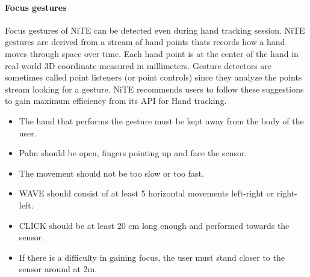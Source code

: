 

\paragraph*{Focus gestures} Focus gestures of NiTE can be detected even during hand tracking session. NiTE gestures are derived from a stream of hand points thats records how a hand moves through space over time. Each hand point is at the center of the hand in real-world 3D coordinate measured in millimeters. Gesture detectors are sometimes called point listeners (or point controls) since they analyze the points stream looking for a gesture. NiTE recommends users to follow these suggestions to gain maximum efficiency from its API for Hand tracking.
\begin{itemize}
	\item The hand that performs the gesture must be kept away from the body of the user. 
	\item Palm should be open, fingers pointing up and face the sensor. 
	\item The movement should not be too slow or too fast. 
	\item WAVE should consist of at least 5 horizontal movements left-right or right-left. 
	\item CLICK should be at least 20 cm long enough and performed towards the sensor. 
	\item If there is a difficulty in gaining focus, the user must stand closer to the sensor around at 2m.
\end{itemize}

